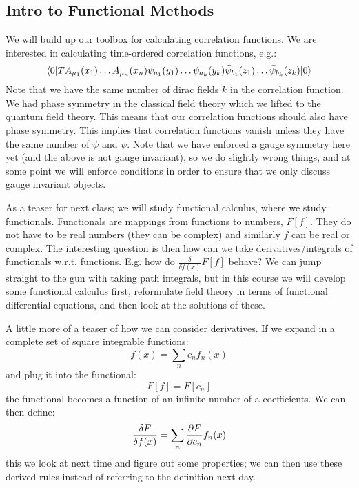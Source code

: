 \subsection{Intro to Functional Methods}
We will build up our toolbox for calculating correlation functions. We are interested in calculating time-ordered correlation functions, e.g.:
\begin{equation}
    \langle 0 \rvert T A_{\mu_1}(x_1)\ldots A_{\mu_n}(x_n)\psi_{a_1}(y_1)\ldots \psi_{a_k}(y_k)\bar{\psi}_{b_1}(z_1) \ldots \bar{\psi}_{b_k}(z_k)\lvert 0 \rangle
\end{equation}
Note that we have the same number of dirac fields $k$ in the correlation function. We had phase symmetry in the classical field theory which we lifted to the quantum field theory. This means that our correlation functions should also have phase symmetry. This implies that correlation functions vanish unless they have the same number of $\psi$ and $\bar{\psi}$. Note that we have enforced a gauge symmetry here yet (and the above is not gauge invariant), so we do slightly wrong things, and at some point we will enforce conditions in order to ensure that we only discuss gauge invariant objects.

As a teaser for next class; we will study functional calculus, where we study functionals. Functionals are mappings from functions to numbers, $F[f]$. They do not have to be real numbers (they can be complex) and similarly $f$ can be real or complex. The interesting question is then how can we take derivatives/integrals of functionals w.r.t. functions. E.g. how do $\frac{\delta}{\delta f(x)}F[f]$ behave? We can jump straight to the gun with taking path integrals, but in this course we will develop some functional calculus first, reformulate field theory in terms of functional differential equations, and then look at the solutions of these.

A little more of a teaser of how we can consider derivatives. If we expand in a complete set of square integrable functions:
\begin{equation}
    f(x) = \sum_n c_n f_n(x)
\end{equation}
and plug it into the functional:
\begin{equation}
    F[f] = F[c_n]
\end{equation}
the functional becomes a function of an infinite number of a coefficients. We can then define:
\begin{equation}
    \frac{\delta F}{\delta f(x)} = \sum_n \frac{\partial F}{\partial c_n}f_n(x)
\end{equation}
this we look at next time and figure out some properties; we can then use these derived rules instead of referring to the definition next day.